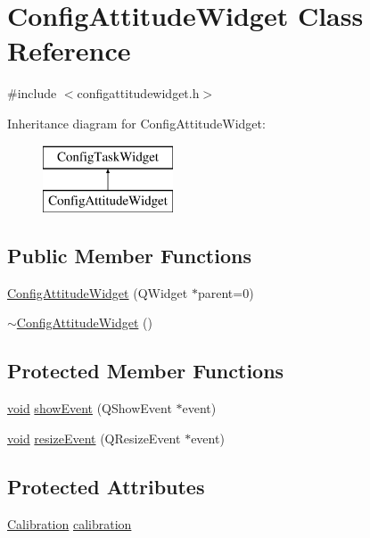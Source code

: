 \hypertarget{class_config_attitude_widget}{\section{\-Config\-Attitude\-Widget \-Class \-Reference}
\label{class_config_attitude_widget}
}


{\ttfamily \#include $<$configattitudewidget.\-h$>$}

\-Inheritance diagram for \-Config\-Attitude\-Widget\-:\begin{figure}[H]
\begin{center}
\leavevmode
\includegraphics[height=2.000000cm]{class_config_attitude_widget}
\end{center}
\end{figure}
\subsection*{\-Public \-Member \-Functions}
\begin{DoxyCompactItemize}
\item 
\hyperlink{group___config_plugin_ga56d10f1f43df3e0490f765a0e36eba72}{\-Config\-Attitude\-Widget} (\-Q\-Widget $\ast$parent=0)
\item 
\hyperlink{group___config_plugin_ga6a068a00a4c75c776ee941255797e705}{$\sim$\-Config\-Attitude\-Widget} ()
\end{DoxyCompactItemize}
\subsection*{\-Protected \-Member \-Functions}
\begin{DoxyCompactItemize}
\item 
\hyperlink{group___u_a_v_objects_plugin_ga444cf2ff3f0ecbe028adce838d373f5c}{void} \hyperlink{group___config_plugin_ga3a79765d89dea1538f1c4393e19a2f39}{show\-Event} (\-Q\-Show\-Event $\ast$event)
\item 
\hyperlink{group___u_a_v_objects_plugin_ga444cf2ff3f0ecbe028adce838d373f5c}{void} \hyperlink{group___config_plugin_ga6422c7d13c247e91f9f9f9bc1d5a8531}{resize\-Event} (\-Q\-Resize\-Event $\ast$event)
\end{DoxyCompactItemize}
\subsection*{\-Protected \-Attributes}
\begin{DoxyCompactItemize}
\item 
\hyperlink{class_calibration}{\-Calibration} \hyperlink{group___config_plugin_ga4b85d588b6292a6f8755725ccca770fb}{calibration}
\end{DoxyCompactItemize}


